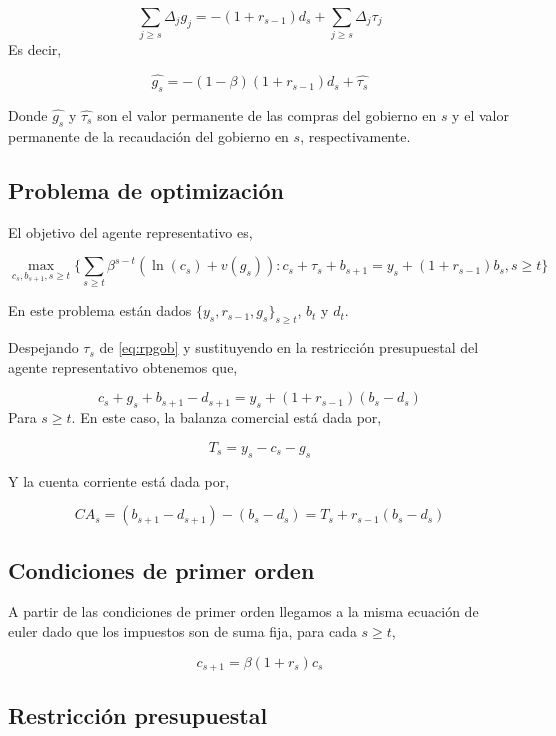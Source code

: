\documentclass[]{article}
\begin{document}
\[
\sum_{j \geq s} \Delta_j g_j = -(1 + r_{s-1})d_s + \sum_{j \geq s} \Delta_j \tau_j 
\] Es decir,

\[
\begin{equation}
\hat{g_s} = -(1-\beta)(1+ r_{s-1})d_s + \hat{\tau_s}
\label{eq:rpgobperm}
\end{equation}
\]

Donde \(\hat{g_s}\) y \(\hat{\tau_s}\) son el valor permanente de las
compras del gobierno en \(s\) y el valor permanente de la recaudación
del gobierno en \(s\), respectivamente.

\subsection{Problema de optimización}\label{problema-de-optimizacion-1}

El objetivo del agente representativo es,

\[
\max_{c_s, b_{s+1}, s\geq t} \{ \sum_{s \geq t} \beta^{s-t}(\ln(c_s) + v(g_s)): c_s + \tau_s + b_{s+1} = y_s + (1+r_{s-1})b_s, s \geq t \} 
\]

En este problema están dados \(\{y_s, r_{s-1}, g_s\}_{s\geq t}\),
\(b_t\) y \(d_t\).

Despejando \(\tau_s\) de \eqref{eq:rpgob} y sustituyendo en la restricción
presupuestal del agente representativo obtenemos que,

\[
\begin{equation}
c_s + g_s + b_{s+1} - d_{s+1} = y_s + (1+r_{s-1})(b_s - d_s)
\label{eq:rpgobcons}
\end{equation}
\] Para \(s \geq t\). En este caso, la balanza comercial está dada por,

\[
T_s = y_s - c_s - g_s
\]

Y la cuenta corriente está dada por,

\[
CA_s = (b_{s+1} - d_{s+1}) - (b_s - d_s) = T_s + r_{s-1}(b_s -d_s)
\]

\subsection{Condiciones de primer
orden}\label{condiciones-de-primer-orden-1}

A partir de las condiciones de primer orden llegamos a la misma ecuación
de euler dado que los impuestos son de suma fija, para cada
\(s \geq t\),

\[
c_{s+1} = \beta(1 + r_{s})c_s
\]

\subsection{Restricción presupuestal}\label{restriccion-presupuestal-1}
\end{document}
